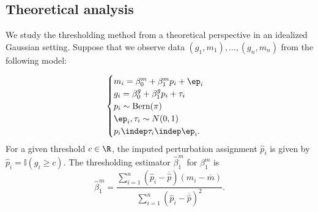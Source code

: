 \documentclass[12pt]{article}
\begin{document}
\subsection{Theoretical analysis}\label{sec:thresholding_theory}

We study the thresholding method from a theoretical perspective in an idealized Gaussian setting. Suppose that we observe data $(g_1, m_1), \dots, (g_n, m_n)$ from the following model:

\begin{equation}\label{theoretical_model}
\begin{cases}
m_i = \beta^m_0 + \beta^m_1 p_i + \ep_i \\
g_i = \beta^g_0 + \beta^g_1 p_i + \tau_i \\
p_i \sim \textrm{Bern}(\pi) \\
\ep_i, \tau_i \sim N(0,1) \\
p_i \indep \tau_i \indep \ep_i.
\end{cases}
\end{equation}
For a given threshold $c \in \R$, the imputed perturbation assignment $\hat{p}_i$ is given by $\hat{p}_i = \mathbb{I}(g_i \geq c).$ The thresholding estimator $\hat{\beta}^m_1$ for $\beta^m_1$ is $$\hat{\beta}^m_1 = \frac{\sum_{i=1}^n (\hat{p}_i - \overline{\hat{p}}) (m_i - \overline{m})}{\sum_{i=1}^n (\hat{p}_i - \overline{\hat{p}})^2 }.$$
\end{document}
